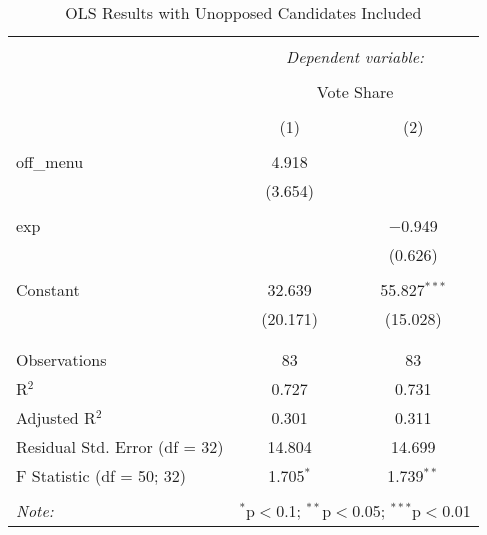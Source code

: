 \begin{table}[H] \centering 
  \caption{OLS Results with Unopposed Candidates Included} 
  \label{} 
\begin{tabular}{@{\extracolsep{5pt}}lcc} 
\\[-1.8ex]\hline 
\hline \\[-1.8ex] 
 & \multicolumn{2}{c}{\textit{Dependent variable:}} \\ 
\cline{2-3} 
\\[-1.8ex] & \multicolumn{2}{c}{Vote Share} \\ 
\\[-1.8ex] & (1) & (2)\\ 
\hline \\[-1.8ex] 
 off\_menu & 4.918 &  \\ 
  & (3.654) &  \\ 
  & & \\ 
 exp &  & $-$0.949 \\ 
  &  & (0.626) \\ 
  & & \\ 
 Constant & 32.639 & 55.827$^{***}$ \\ 
  & (20.171) & (15.028) \\ 
  & & \\ 
\hline \\[-1.8ex] 
Observations & 83 & 83 \\ 
R$^{2}$ & 0.727 & 0.731 \\ 
Adjusted R$^{2}$ & 0.301 & 0.311 \\ 
Residual Std. Error (df = 32) & 14.804 & 14.699 \\ 
F Statistic (df = 50; 32) & 1.705$^{*}$ & 1.739$^{**}$ \\ 
\hline 
\hline \\[-1.8ex] 
\textit{Note:}  & \multicolumn{2}{r}{$^{*}$p$<$0.1; $^{**}$p$<$0.05; $^{***}$p$<$0.01} \\ 
\end{tabular} 
\end{table} 




